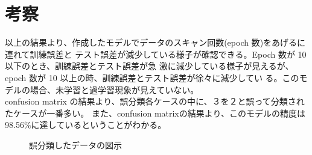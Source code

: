 \documentclass{jarticle}
\begin{document}
\section{考察}
以上の結果より、作成したモデルでデータのスキャン回数(epoch 数)をあげるに連れて訓練誤差と テスト誤差が減少している様子が確認できる。Epoch 数が 10 以下のとき、訓練誤差とテスト誤差が急 激に減少している様子が見えるが、epoch 数が 10 以上の時、訓練誤差とテスト誤差が徐々に減少してい る。このモデルの場合、未学習と過学習現象が見えていない。\\
confusion matrix の結果より、誤分類各ケースの中に、３を２と誤って分類されたケースが一番多い。
また、confusion matrixの結果より、このモデルの精度は98.56\%に達しているということがわかる。\\
\begin{figure}[h]
\centering
{}%
\qquad
{}%
\caption{誤分類したデータの図示}%
\label{fig:example}%
\end{figure}


\end{document}
